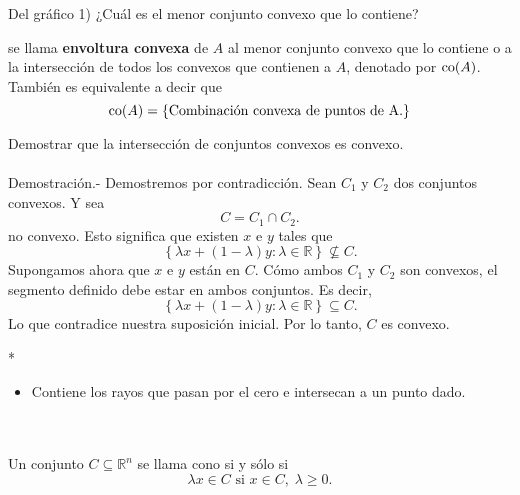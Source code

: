 \begin{paracol}{2}
Del gráfico 1) ¿Cuál es el menor conjunto convexo que lo contiene?
\begin{center}
\end{center}

\begin{def.}
    se llama \textbf{envoltura convexa} de $A$ al menor conjunto convexo que lo contiene o a la intersección de todos los convexos que contienen a $A$, denotado por $\mathop{\mbox{\normalfont co}}\nolimits(A)$.
    También es equivalente a decir que
    $$\mathop{\mbox{\normalfont co}}\nolimits(A)=\left\{\mbox{Combinación convexa de puntos de A.}\right\}$$
\end{def.}

{\color{blue}
\begin{ejer}
    Demostrar que la intersección de conjuntos convexos es convexo.\\\\
	Demostración.-\; Demostremos por contradicción. Sean $C_1$ y $C_2$ dos conjuntos convexos. Y sea 
	$$C=C_1\cap C_2.$$
	no convexo. Esto significa que existen $x$ e $y$ tales que 
	$$\left\{\lambda x + (1-\lambda)y:\lambda\in \mathbb{R}\right\}\not\subseteq C.$$ 
	Supongamos ahora que $x$ e $y$ están en $C$. Cómo ambos $C_1$ y $C_2$ son convexos, el segmento definido debe estar en ambos conjuntos. Es decir,
	$$\left\{\lambda x + (1-\lambda)y:\lambda\in \mathbb{R}\right\}\subseteq C.$$ 
	Lo que contradice nuestra suposición inicial. Por lo tanto, $C$ es convexo.
\end{ejer}
}


\switchcolumn[1]*{\noindent\scriptsize
    \begin{itemize}
	\item Contiene los rayos que pasan por el cero e intersecan a un punto dado.
    \end{itemize}
}
\switchcolumn[0]\noindent
\begin{def.}[Cono]\,\\\\
    Un conjunto $C\subseteq \mathbb{R}^n$ se llama cono si y sólo si
    $$\lambda x\in C \mbox{ si } x\in C,\; \lambda \geq 0.$$


\end{def.}
\end{paracol}
